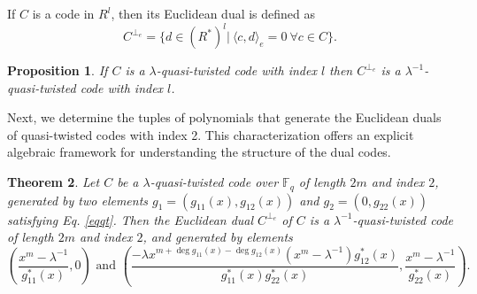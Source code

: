 \documentclass[12 pt]{extarticle}
\numberwithin{equation}{section}
\newtheorem{theorem}{Theorem}[section]
\newtheorem{proposition}[theorem]{Proposition}
\theoremstyle{definition}
\begin{document}
If $C$ is a code in $R^l$, then its Euclidean  dual is defined as 
$$C^{\perp_e}=\{d\in (R^*)^l | \ \langle c, d \rangle_e=0 \ \forall c\in C\}.$$

\begin{proposition}\cite[Proposition 1]{jia2011}\label{ldual}
  If $C$ is a $\lambda$-quasi-twisted code with index $l$ then $C^{\perp_e}$ is a $\lambda^{-1}$-quasi-twisted code with index $l$.  
\end{proposition}

Next, we determine the tuples of polynomials that generate the Euclidean duals of quasi-twisted codes with index 2. This characterization offers an explicit algebraic framework for understanding the structure of the dual codes.

\begin{theorem}\label{thmedual}
    Let $C$ be a $\lambda$-quasi-twisted code over $\mathbb{F}_q$ of length $2m$ and index $2$, generated by two elements $g_1=(g_{11}(x),g_{12}(x))$ and $g_2=(0,g_{22}(x))$ satisfying Eq. \ref{eqqt}.    Then the Euclidean dual $C^{\perp_e}$  of $C$ is a $\lambda^{-1}$-quasi-twisted code of length $2m$ and index $2$, and generated by elements $$\left (\frac{x^m-\lambda^{-1}}{g^*_{11}(x)},0\right) \text{ and } \left(\frac{-\lambda x^{m+\deg g_{11}(x)-\deg g_{12}(x)}(x^m-\lambda^{-1})g^*_{12}(x)}{g^*_{11}(x)g^*_{22}(x)},\frac{x^m-\lambda^{-1}}{g^*_{22}(x)}\right).$$
\end{theorem}
\end{document}
